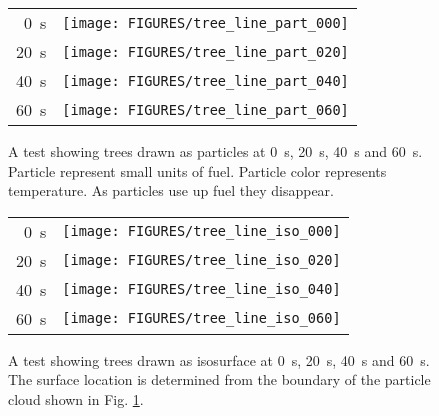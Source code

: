 \begin{figure}[\figoptions]
\begin{center}
\begin{tabular}{rc}
 \SI{0}{s}&\texttt{[image: FIGURES/tree\_line\_part\_000]}\\
 \SI{20}{s}&\texttt{[image: FIGURES/tree\_line\_part\_020]}\\
 \SI{40}{s}&\texttt{[image: FIGURES/tree\_line\_part\_040]}\\
 \SI{60}{s}&\texttt{[image: FIGURES/tree\_line\_part\_060]}
 \end{tabular}
\end{center}
 \caption[A test showing trees drawn as particles.]{A test showing trees drawn as particles at \SI{0}{s}, \SI{20}{s}, \SI{40}{s} and \SI{60}{s}.  Particle represent small units of fuel.
 Particle color represents temperature.  As particles use up fuel they disappear.}
\label{figWUIparts}%
\end{figure}

\begin{figure}[\figoptions]
\begin{center}
\begin{tabular}{rc}
 \SI{0}{s}&\texttt{[image: FIGURES/tree\_line\_iso\_000]}\\
 \SI{20}{s}&\texttt{[image: FIGURES/tree\_line\_iso\_020]}\\
 \SI{40}{s}&\texttt{[image: FIGURES/tree\_line\_iso\_040]}\\
 \SI{60}{s}&\texttt{[image: FIGURES/tree\_line\_iso\_060]}
 \end{tabular}
\end{center}
 \caption[A test showing trees drawn as isosurfaces.]{A test showing trees drawn as isosurface  at \SI{0}{s}, \SI{20}{s}, \SI{40}{s} and \SI{60}{s}.  The surface location
 is determined from the boundary of the  particle cloud shown in Fig. \ref{figWUIparts}.}
\label{figWUIiso}%
\end{figure}
\npage
